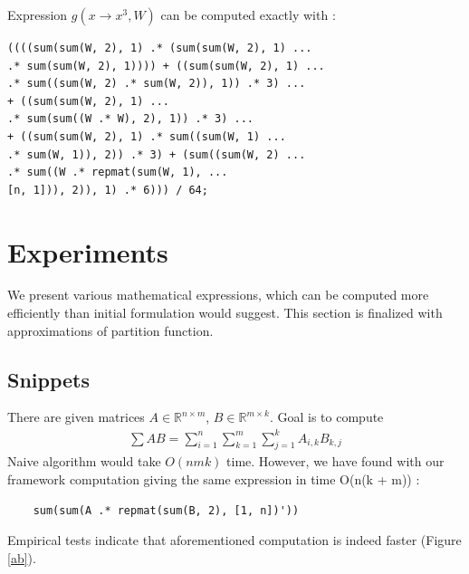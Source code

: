 \documentclass{article}
\begin{document}
Expression $g(x \rightarrow x^3, W)$ can be computed exactly with :

\begingroup
    \fontsize{8pt}{12pt}\selectfont
\begin{verbatim}
((((sum(sum(W, 2), 1) .* (sum(sum(W, 2), 1) ...
.* sum(sum(W, 2), 1)))) + ((sum(sum(W, 2), 1) ...
.* sum((sum(W, 2) .* sum(W, 2)), 1)) .* 3) ...
+ ((sum(sum(W, 2), 1) ...
.* sum(sum((W .* W), 2), 1)) .* 3) ...
+ ((sum(sum(W, 2), 1) .* sum((sum(W, 1) ...
.* sum(W, 1)), 2)) .* 3) + (sum((sum(W, 2) ...
.* sum((W .* repmat(sum(W, 1), ...
[n, 1])), 2)), 1) .* 6))) / 64;
\end{verbatim}
\endgroup


\section{Experiments}

We present various mathematical expressions, which can be computed more efficiently
than initial formulation would suggest. This section is finalized with  
approximations of partition function. 

\subsection{Snippets}

There are given matrices $A \in \mathbb{R}^{n \times m}$, $B \in \mathbb{R}^{m \times k}$. 
Goal is to compute 
\begin{align*}
	\sum AB = \sum_{i = 1}^n \sum_{k = 1}^m \sum_{j = 1}^k A_{i, k} B_{k, j} 
\end{align*}
Naive algorithm would take $O(nmk)$ time. However, we have found with our framework 
computation giving the same expression in time O(n(k + m)) :

\begin{verbatim}
	sum(sum(A .* repmat(sum(B, 2), [1, n])'))
\end{verbatim}

Empirical tests indicate that aforementioned computation is indeed faster (Figure \ref{ab}).
\end{document}

